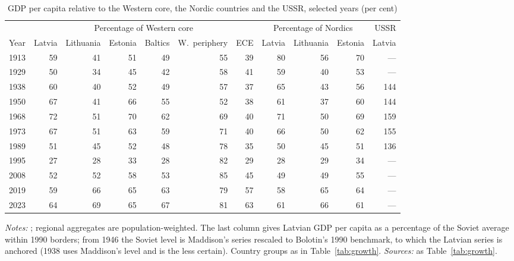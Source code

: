 \begin{table}[htbp]
\centering\scriptsize\setlength{\tabcolsep}{2.5pt}
\caption{GDP per capita relative to the Western core, the Nordic countries and the USSR, selected years (per cent)}
\label{tab:relative}
\begin{threeparttable}
\begin{tabular}{lrrrrrrrrrr}
\toprule
& \multicolumn{6}{c}{Percentage of Western core} & \multicolumn{3}{c}{Percentage of Nordics} & USSR \\
\cmidrule(lr){2-7}\cmidrule(lr){8-10}\cmidrule(lr){11-11}
Year & Latvia & Lithuania & Estonia & Baltics & W.\ periphery & ECE & Latvia & Lithuania & Estonia & Latvia \\
\midrule
1913 & 59 & 41 & 51 & 49 & 55 & 39 & 80 & 56 & 70 & --- \\
1929 & 50 & 34 & 45 & 42 & 58 & 41 & 59 & 40 & 53 & --- \\
1938 & 60 & 40 & 52 & 49 & 57 & 37 & 65 & 43 & 56 & 144 \\
\midrule
1950 & 67 & 41 & 66 & 55 & 52 & 38 & 61 & 37 & 60 & 144 \\
1968 & 72 & 51 & 70 & 62 & 69 & 40 & 71 & 50 & 69 & 159 \\
1973 & 67 & 51 & 63 & 59 & 71 & 40 & 66 & 50 & 62 & 155 \\
1989 & 51 & 45 & 52 & 48 & 78 & 35 & 50 & 45 & 51 & 136 \\
\midrule
1995 & 27 & 28 & 33 & 28 & 82 & 29 & 28 & 29 & 34 & --- \\
2008 & 52 & 52 & 58 & 53 & 85 & 45 & 49 & 49 & 55 & --- \\
2019 & 59 & 66 & 65 & 63 & 79 & 57 & 58 & 65 & 64 & --- \\
2023 & 64 & 69 & 65 & 67 & 81 & 63 & 61 & 66 & 61 & --- \\
\bottomrule
\end{tabular}
\begin{tablenotes}
\footnotesize
\textit{Notes:} \intlnineteen{}; regional aggregates are population-weighted. The last column gives Latvian GDP per capita as a percentage of the Soviet average within 1990 borders; from 1946 the Soviet level is Maddison's series rescaled to Bolotin's 1990 benchmark, to which the Latvian series is anchored (1938 uses Maddison's level and is the less certain). Country groups as in Table~\ref{tab:growth}. \textit{Sources:} as Table~\ref{tab:growth}.
\end{tablenotes}
\end{threeparttable}
\end{table}
